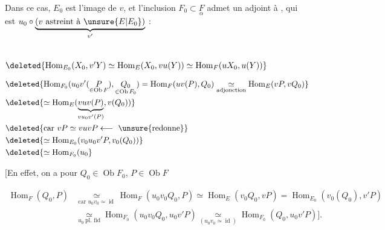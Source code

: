 
Dans ce cas, $E_0$ est l'image  de $v$, et l'inclusion $F_0\subset\underset{\alpha}{F}$ admet un adjoint à , qui est  $u_0\circ\underbrace{(v\ \text{astreint à }\unsure{E|E_0})}_{v'}$ :

\\
$\deleted{\operatorname{Hom}_{E_0}(X_0,v'Y)\simeq\operatorname{Hom}_{E}(X_0,vu(Y))\simeq\operatorname{Hom}_{F}(uX_0,u(Y))}$


\[
\begin{aligned}
&\deleted{\operatorname{Hom}_{F_0}(u_0v'(\underset{\in\operatorname{Ob}F}{P}),\underset{\in\operatorname{Ob}F_0}{Q_0})=\operatorname{Hom}_{F}(uv(P),Q_0)
 \underset{\text{adjonction}}{\simeq}\operatorname{Hom}_{E}(vP,vQ_0)}\\
&\deleted{\simeq\operatorname{Hom}_{E}(\underbrace{vuv(P)}_{vu_0v'(P)},v(Q_0))}\\
&\deleted{\text{car }vP\simeq vuvP\longleftarrow\ \unsure{\text{redonne}}}\\
&\deleted{\simeq\operatorname{Hom}_{E_0}(v_0u_0v'P,v_0(Q_0))}\\
&\deleted{\simeq\operatorname{Hom}_{F_0}(u_0}
\end{aligned}
\]

[En effet, on a pour $Q_0\in\operatorname{Ob}F_0$, $P\in\operatorname{Ob}F$

\[
\begin{aligned}
\operatorname{Hom}_{F}(Q_0,P)&\underset{\text{car }u_0v_0\simeq\operatorname{id}}{\simeq}
\operatorname{Hom}_{F}(u_0v_0Q_0,P)\simeq\operatorname{Hom}_{E}(v_0Q_0,vP)=\operatorname{Hom}_{E_0}(v_0(Q_0),v'P)\\
&\underset{u_0\ \text{pl. fid}}{\simeq}\operatorname{Hom}_{F_0}(u_0v_0Q_0,u_0v'P)
\underset{(u_0v_0\simeq\operatorname{id})}{\simeq}\operatorname{Hom}_{F_0}(Q_0,u_0v'P)\big].
\end{aligned}
\]

